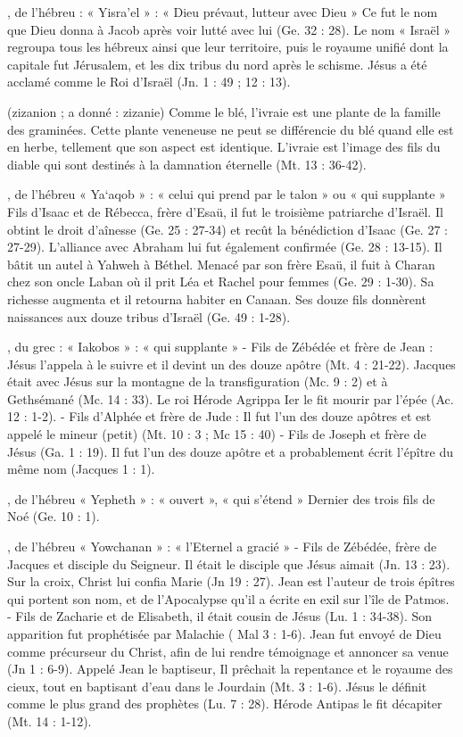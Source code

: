\begin{multicols}{2}
, de l'hébreu : « Yisra'el » : « Dieu prévaut, lutteur avec Dieu »
Ce fut le nom que Dieu donna à Jacob après voir lutté avec lui (Ge. 32 : 28). Le nom « Israël » regroupa tous les hébreux ainsi que leur territoire, puis le royaume unifié dont la capitale fut Jérusalem, et les dix tribus du nord après le schisme. Jésus a été acclamé comme le Roi d'Israël (Jn. 1 : 49 ; 12 : 13).


(zizanion ; a donné : zizanie)
Comme le blé, l'ivraie est une plante de la famille des graminées.
Cette plante veneneuse ne peut se différencie du blé quand elle est en herbe, tellement que son aspect est identique. L'ivraie est l'image des fils du diable qui sont destinés à la damnation éternelle (Mt. 13 : 36-42).


, de l'hébreu « Ya`aqob » : « celui qui prend par le talon » ou « qui supplante »
Fils d'Isaac et de Rébecca, frère d'Esaü, il fut le troisième patriarche d'Israël. Il obtint le droit d’aînesse (Ge. 25 : 27-34) et recût la bénédiction d'Isaac (Ge. 27 : 27-29). L'alliance avec Abraham lui fut également confirmée (Ge. 28 : 13-15). Il bâtit un autel à Yahweh à Béthel. Menacé par son frère Esaü, il fuit à Charan chez son oncle Laban où il prit Léa et Rachel pour femmes (Ge. 29 : 1-30). Sa richesse augmenta et il retourna habiter en Canaan. Ses douze fils donnèrent naissances aux douze tribus d'Israël (Ge. 49 : 1-28).


, du grec : « Iakobos » : « qui supplante »
- Fils de Zébédée et frère de Jean : Jésus l'appela à le suivre et il devint un des douze apôtre (Mt. 4 : 21-22). Jacques était avec Jésus sur la montagne de la transfiguration (Mc. 9 : 2) et à Gethsémané (Mc. 14 : 33). Le roi Hérode Agrippa Ier le fit mourir par l'épée (Ac. 12 : 1-2).
- Fils d'Alphée et frère de Jude : Il fut l'un des douze apôtres et est appelé le mineur (petit) (Mt. 10 : 3 ; Mc 15 : 40)
- Fils de Joseph et frère de Jésus (Ga. 1 : 19). Il fut l'un des douze apôtre et a probablement écrit l'épître du même nom (Jacques 1 : 1).


, de l'hébreu « Yepheth » : « ouvert », « qui s'étend »
Dernier des trois fils de Noé (Ge. 10 : 1).


, de l'hébreu « Yowchanan » : « l'Eternel a gracié »
- Fils de Zébédée, frère de Jacques et disciple du Seigneur. Il était le disciple que Jésus aimait (Jn. 13 : 23). Sur la croix, Christ lui confia Marie (Jn 19 : 27). Jean est l'auteur de trois épîtres qui portent son nom, et de l'Apocalypse qu'il a écrite en exil sur l'île de Patmos.
- Fils de Zacharie et de Elisabeth, il était cousin de Jésus (Lu. 1 : 34-38). Son apparition fut prophétisée par Malachie ( Mal 3 : 1-6). Jean fut envoyé de Dieu comme précurseur du Christ, afin de lui rendre témoignage et annoncer sa venue (Jn 1 : 6-9). Appelé Jean le baptiseur, Il prêchait la repentance et le royaume des cieux, tout en baptisant d'eau dans le Jourdain (Mt. 3 : 1-6). Jésus le définit comme le plus grand des prophètes (Lu. 7 : 28). Hérode Antipas le fit décapiter (Mt. 14 : 1-12).



\end{multicols}
